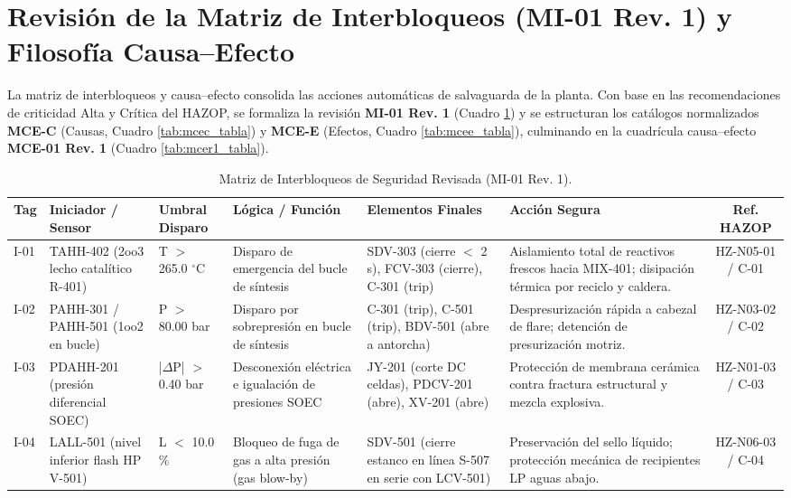 \documentclass[10pt,letterpaper]{article}
\begin{document}
\section{Revisión de la Matriz de Interbloqueos (MI-01 Rev. 1) y Filosofía Causa--Efecto}
La matriz de interbloqueos y causa--efecto consolida las acciones automáticas de salvaguarda de la planta. Con base en las recomendaciones de criticidad Alta y Crítica del HAZOP, se formaliza la revisión \textbf{MI-01 Rev. 1} (Cuadro \ref{tab:mi01_tabla}) y se estructuran los catálogos normalizados \textbf{MCE-C} (Causas, Cuadro \ref{tab:mcec_tabla}) y \textbf{MCE-E} (Efectos, Cuadro \ref{tab:mcee_tabla}), culminando en la cuadrícula causa--efecto \textbf{MCE-01 Rev. 1} (Cuadro \ref{tab:mcer1_tabla}).

\begin{table}[H]
\centering\footnotesize
\caption{Matriz de Interbloqueos de Seguridad Revisada (MI-01 Rev. 1).} \label{tab:mi01_tabla}
\begin{tabularx}{\textwidth}{|l|p{2.8cm}|p{2.0cm}|p{3.0cm}|p{3.2cm}|X|c|}
\hline
\rowcolor{tableheader}\color{white}\textbf{Tag} & \color{white}\textbf{Iniciador / Sensor} & \color{white}\textbf{Umbral Disparo} & \color{white}\textbf{Lógica / Función} & \color{white}\textbf{Elementos Finales} & \color{white}\textbf{Acción Segura} & \color{white}\textbf{Ref. HAZOP} \\ \hline
I-01 & TAHH-402 (2oo3 lecho catalítico R-401) & T $>$ 265.0 $^\circ$C & Disparo de emergencia del bucle de síntesis & SDV-303 (cierre $<$ 2 s), FCV-303 (cierre), C-301 (trip) & Aislamiento total de reactivos frescos hacia MIX-401; disipación térmica por reciclo y caldera. & HZ-N05-01 / C-01 \\ \hline
I-02 & PAHH-301 / PAHH-501 (1oo2 en bucle) & P $>$ 80.00 bar & Disparo por sobrepresión en bucle de síntesis & C-301 (trip), C-501 (trip), BDV-501 (abre a antorcha) & Despresurización rápida a cabezal de flare; detención de presurización motriz. & HZ-N03-02 / C-02 \\ \hline
I-03 & PDAHH-201 (presión diferencial SOEC) & |$\Delta$P| $>$ 0.40 bar & Desconexión eléctrica e igualación de presiones SOEC & JY-201 (corte DC celdas), PDCV-201 (abre), XV-201 (abre) & Protección de membrana cerámica contra fractura estructural y mezcla explosiva. & HZ-N01-03 / C-03 \\ \hline
I-04 & LALL-501 (nivel inferior flash HP V-501) & L $<$ 10.0 \% & Bloqueo de fuga de gas a alta presión (gas blow-by) & SDV-501 (cierre estanco en línea S-507 en serie con LCV-501) & Preservación del sello líquido; protección mecánica de recipientes LP aguas abajo. & HZ-N06-03 / C-04 \\ \hline

\end{tabularx}
\end{table}
\end{document}
